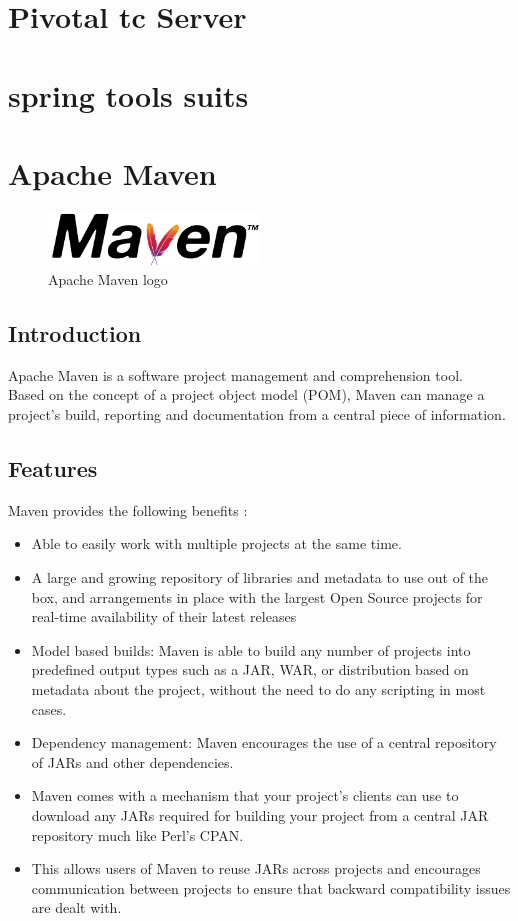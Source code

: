 \documentclass[12pt]{article}
\begin{document}
\section{Pivotal tc Server}
\section{spring tools suits}
\section{Apache Maven}
\begin{figure}[h]
	\centering
	\includegraphics[width=0.5\textwidth]{Maven_logo.png}
	\caption{Apache Maven logo}
\end{figure}
\subsection{Introduction}

Apache Maven is a software project management and comprehension tool.\\Based on the concept of a project object model (POM), Maven can manage a project's build, reporting and documentation from a central piece of information.\\

\subsection{Features}
Maven provides the following benefits :
\begin{itemize}
	\item Able to easily work with multiple projects at the same time.
	\item A large and growing repository of libraries and metadata to use out of the box, and arrangements in place with the largest Open Source projects for real-time availability of their latest releases
	\item Model based builds: Maven is able to build any number of projects into predefined output types such as a JAR, WAR, or distribution based on metadata about the project, without the need to do any scripting in most cases.
	\item Dependency management: Maven encourages the use of a central repository of JARs and other dependencies.
	\item Maven comes with a mechanism that your project's clients can use to download any JARs required for building your project from a central JAR repository much like Perl's CPAN.
	\item This allows users of Maven to reuse JARs across projects and encourages communication between projects to ensure that backward compatibility issues are dealt with.
\end{itemize}
\end{document}
